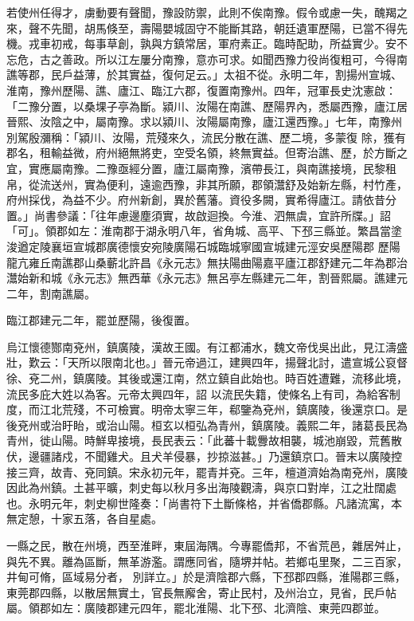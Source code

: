 \begin{pinyinscope}
 若使州任得才，虜動要有聲聞，豫設防禦，此則不俟南豫。假令或慮一失，醜羯之來，聲不先聞，胡馬倏至，壽陽嬰城固守不能斷其路，朝廷遺軍歷陽，已當不得先機。戎車初戒，每事草創，孰與方鎮常居，軍府素正。臨時配助，所益實少。安不忘危，古之善政。所以江左屢分南豫，意亦可求。如聞西豫力役尚復粗可，今得南譙等郡，民戶益薄，於其實益，復何足云。」太祖不從。永明二年，割揚州宣城、淮南，豫州歷陽、譙、廬江、臨江六郡，復置南豫州。四年，冠軍長史沈憲啟：「二豫分置，以桑堁子亭為斷。潁川、汝陽在南譙、歷陽界內，悉屬西豫，廬江居晉熙、汝陰之中，屬南豫。求以潁川、汝陽屬南豫，廬江還西豫。」七年，南豫州別駕殷瀰稱：「潁川、汝陽，荒殘來久，流民分散在譙、歷二境，多蒙復
 除，獲有郡名，租輸益微，府州絕無將吏，空受名領，終無實益。但寄治譙、歷，於方斷之宜，實應屬南豫。二豫亟經分置，廬江屬南豫，濱帶長江，與南譙接境，民黎租帛，從流送州，實為便利，遠逾西豫，非其所願，郡領灊舒及始新左縣，村竹產，府州採伐，為益不少。府州新創，異於舊藩。資役多闕，實希得廬江。請依昔分置。」尚書參議：「往年慮邊塵須實，故啟迴換。今淮、泗無虞，宜許所牒。」詔「可」。領郡如左：淮南郡于湖永明八年，省角城、高平、下邳三縣並。繁昌當塗浚遒定陵襄垣宣城郡廣德懷安宛陵廣陽石城臨城寧國宣城建元涇安吳歷陽郡
 歷陽龍亢雍丘南譙郡山桑蘄北許昌《永元志》無扶陽曲陽嘉平廬江郡舒建元二年為郡治灊始新和城《永元志》無西華《永元志》無呂亭左縣建元二年，割晉熙屬。譙建元二年，割南譙屬。



 臨江郡建元二年，罷並歷陽，後復置。



 烏江懷德酂南兗州，鎮廣陵，漢故王國。有江都浦水，魏文帝伐吳出此，見江濤盛壯，歎云：「天所以限南北也。」晉元帝過江，建興四年，揚聲北討，遣宣城公裒督徐、兗二州，鎮廣陵。其後或還江南，然立鎮自此始也。時百姓遭難，流移此境，流民多庇大姓以為客。元帝太興四年，詔
 以流民失籍，使條名上有司，為給客制度，而江北荒殘，不可檢實。明帝太寧三年，郗鑒為兗州，鎮廣陵，後還京口。是後兗州或治盱眙，或治山陽。桓玄以桓弘為青州，鎮廣陵。義熙二年，諸葛長民為青州，徙山陽。時鮮卑接境，長民表云：「此蕃十載釁故相襲，城池崩毀，荒舊散伏，邊疆諸戍，不聞雞犬。且犬羊侵暴，抄掠滋甚。」乃還鎮京口。晉末以廣陵控接三齊，故青、兗同鎮。宋永初元年，罷青并兗。三年，檀道濟始為南兗州，廣陵因此為州鎮。土甚平曠，刺史每以秋月多出海陵觀濤，與京口對岸，江之壯闊處也。永明元年，刺史柳世隆奏：「尚書符下土斷條格，并省僑郡縣。凡諸流寓，本無定憩，十家五落，各自星處。



 一縣之民，散在州境，西至淮畔，東屆海隅。今專罷僑邦，不省荒邑，雜居舛止，與先不異。離為區斷，無革游濫。謂應同省，隨堺并帖。若鄉屯里聚，二三百家，井甸可脩，區域易分者，
 別詳立。」於是濟陰郡六縣，下邳郡四縣，淮陽郡三縣，東莞郡四縣，以散居無實土，官長無廨舍，寄止民村，及州治立，見省，民戶帖屬。領郡如左：廣陵郡建元四年，罷北淮陽、北下邳、北濟陰、東莞四郡並。




\end{pinyinscope}
